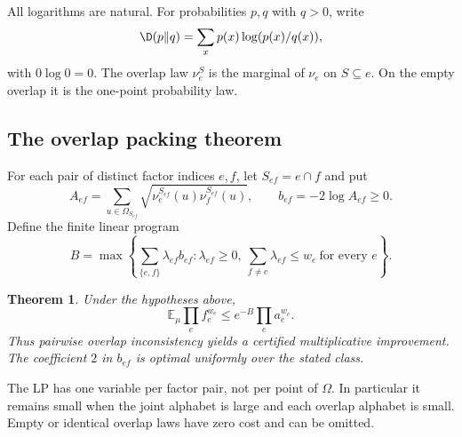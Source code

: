 \documentclass[11pt,a4paper]{article}
\newtheorem{theorem}{Theorem}[section]
\theoremstyle{definition}\newtheorem{definition}[theorem]{Definition}
\theoremstyle{remark}\newtheorem{remark}[theorem]{Remark}
\newcommand{\E}{\mathbb E}\newcommand{\one}{\mathbf 1}\newcommand{\1}{\mathbf 1}
\numberwithin{equation}{section}
\begin{document}
All logarithms are natural. For probabilities $p,q$ with $q>0$, write
\[\D(p\Vert q)=\sum_xp(x)\log(p(x)/q(x)),\]
with $0\log0=0$. The overlap law $\nu_e^S$ is the marginal of $\nu_e$ on $S\subseteq e$. On the empty overlap it is the one-point probability law.

\subsection{The overlap packing theorem}\label{R01-sec-2}
For each pair of distinct factor indices $e,f$, let $S_{ef}=e\cap f$ and put
\[
A_{ef}=\sum_{u\in\Omega_{S_{ef}}}\sqrt{\nu_e^{S_{ef}}(u)\nu_f^{S_{ef}}(u)},
\qquad b_{ef}=-2\log A_{ef}\geq0.
\]
Define the finite linear program
\begin{equation}\label{R01-LP}
 B=\max\left\{\sum_{\{e,f\}}\lambda_{ef}b_{ef}:\lambda_{ef}\geq0,
 \ \sum_{f\ne e}\lambda_{ef}\leq w_e\ \text{for every }e\right\}.
\end{equation}
\begin{theorem}\label{R01-main}
Under the hypotheses above,
\begin{equation}\label{R01-bound}
\E_\mu\prod_e f_e^{w_e}\leq e^{-B}\prod_e a_e^{w_e}.
\end{equation}
Thus pairwise overlap inconsistency yields a certified multiplicative improvement. The coefficient $2$ in $b_{ef}$ is optimal uniformly over the stated class.
\end{theorem}

The LP has one variable per factor pair, not per point of $\Omega$. In particular it remains small when the joint alphabet is large and each overlap alphabet is small. Empty or identical overlap laws have zero cost and can be omitted.
\end{document}
